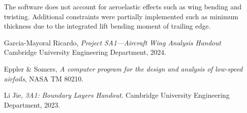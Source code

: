 \documentclass{article}
\begin{document}
The software does not account for aeroelastic effects such as wing bending and twisting.
Additional constraints were partially implemented such as minimum thickness due to the integrated lift bending moment of trailing edge.


\begin{thebibliography}{9}
    Garcia-Mayoral Ricardo, \textit{Project SA1—Aircraft Wing Analysis Handout} Cambridge University Engineering Department, 2024.

    Eppler \& Somers, \textit{A computer program for the design and analysis of low-speed airfoils}, NASA TM 80210.

    Li Jie, \textit{3A1: Boundary Layers Handout}. Cambridge University Engineering Department, 2023.
\end{thebibliography}
\end{document}
